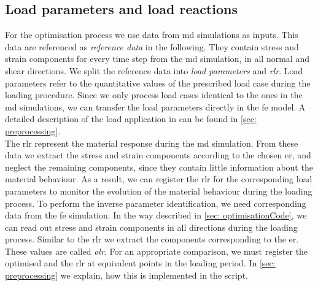 \subsection{Load parameters and load reactions}\label{subsec:loadParameters}
For the optimisation process we use data from \acrshort{md} simulations as inputs.
This data are referenced as \emph{reference data} in the following. They contain stress and strain components for every time step from the \acrshort{md} simulation, in all normal and shear directions.
We split the reference data into \emph{load parameters} and \emph{\acrlong{rlr}}.
Load parameters refer to the quantitative values of the prescribed load case during the loading procedure.
Since we only process load cases identical to the ones in the \acrshort{md} simulations, we can transfer the load parameters directly in the \acrshort{fe} model.
A detailed description of the load application in  can be found in \autoref{sec: preprocessing}. \\
\indent The \acrlong{rlr} represent the material response during the \acrshort{md} simulation.
From these data we extract the stress and strain components according to the chosen \acrlong{er}, and neglect the remaining components, since they contain little information about the material behaviour.
As a result, we can register the \acrlong{rlr} for the corresponding load parameters to monitor the evolution of the material behaviour during the loading process.
To perform the inverse parameter identification, we need corresponding data from the \acrshort{fe} simulation.
In the way described in \autoref{sec: optimisationCode}, we can read out stress and strain components in all directions during the loading process.
Similar to the \acrlong{rlr} we extract the components corresponding to the \acrlong{er}.
These values are called \emph{\acrlong{olr}}. 
For an appropriate comparison, we must register the optimised and the \acrlong{rlr} at equivalent points in the loading period.
In \autoref{sec: preprocessing} we explain, how this is implemented in the script.

